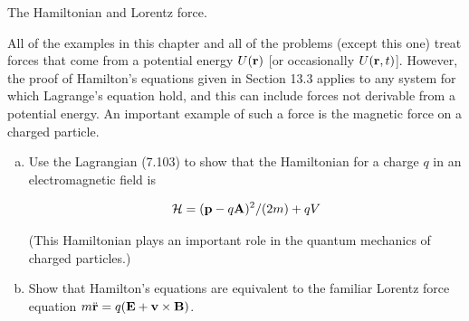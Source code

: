 \documentclass[11pt,letterpaper,boxed]{../hmcpsetrhino}
\def\Ham{\mathcal{H}}
\begin{document}
\newpage

\begin{problem}[iii]
The Hamiltonian and Lorentz force.

\begin{problem}[13.18]
All of the examples in this chapter and all of the problems (except this one) treat forces that come from a potential energy $U(\bf r)$ [or occasionally $U({\bf r}, t)$]. However, the proof of Hamilton's equations given in Section 13.3 applies to any system for which Lagrange's equation hold, and this can include forces not derivable from a potential energy. An important example of such a force is the magnetic force on a charged particle. 

\begin{enumerate}[(a)]
\item Use the Lagrangian (7.103) to show that the Hamiltonian for a charge $q$ in an electromagnetic field is 

\[	\Ham = ({\bf p} - q {\bf A})^2/(2 m) + qV\]

(This Hamiltonian plays an important role in the quantum mechanics of charged particles.)

\item Show that Hamilton's equations are equivalent to the familiar Lorentz force equation $m \ddot{\bf r} = q(\bf E + v \times B)$.

\end{enumerate}
\end{problem}
\end{problem}
\begin{solution}


\vfill
\end{solution}

\newpage
\end{document}
